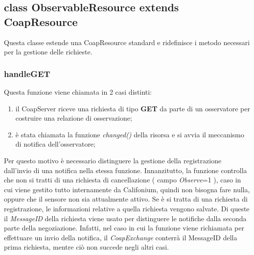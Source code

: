 		\subsection { class ObservableResource extends CoapResource}
			Questa classe estende una CoapResource standard e ridefinisce i metodo necessari per la gestione delle richieste.
			\subsubsection{handleGET}
				Questa funzione viene chiamata in 2 casi distinti:
				\begin{enumerate}
					\item il CoapServer riceve una richiesta di tipo \textbf{GET} da parte di un osservatore per costruire una relazione di osservazione;
					\item è stata chiamata la funzione \textit{changed()} della risorsa e si avvia il meccanismo di notifica dell'osservatore;
				\end{enumerate}
				Per questo motivo è necessario distinguere la gestione della registrazione dall'invio di una notifica nella stessa funzione. \newline
				Innanzitutto, la funzione controlla che non si tratti di una richiesta di cancellazione ( campo \textit{Observe}=1 ), caso in cui viene gestito tutto internamente da Califonium, quindi non bisogna fare nulla, oppure che il sensore non sia attualmente attivo. \newline
				Se è si tratta di una richiesta di registrazione, le informazioni relative a quella richiesta vengono salvate. Di queste il \textit{MessageID} della richiesta viene usato per distinguere le notifiche dalla seconda parte della negoziazione. Infatti, nel caso in cui la funzione viene richiamata per effettuare un invio della notifica, il \textit{CoapExchange} conterrà il MessageID della prima richiesta, mentre ciò non succede negli altri casi.
				

